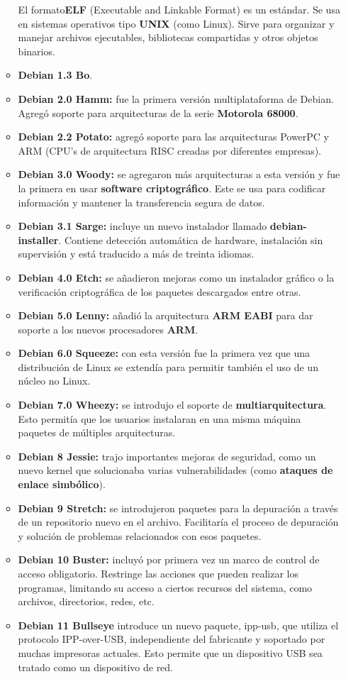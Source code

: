 \documentclass[a4paper, 12pt]{book}
\begin{document}
\begin{itemize}
\begin{itemize}
		El formato\textbf{ELF} (Executable and Linkable Format) es un estándar. Se usa en sistemas operativos tipo \textbf{UNIX} (como Linux). Sirve para organizar y manejar archivos ejecutables, bibliotecas compartidas y otros objetos binarios.
		\item \textbf {Debian 1.3 Bo}.
		\item \textbf {Debian 2.0 Hamm: }fue la primera versión multiplataforma de Debian. Agregó soporte para arquitecturas de la serie \textbf{Motorola 68000}.
		\item \textbf {Debian 2.2 Potato: }agregó soporte para las arquitecturas  PowerPC y ARM (CPU's de arquitectura RISC creadas por diferentes empresas).
		\item \textbf {Debian 3.0 Woody: }se agregaron más arquitecturas a esta versión y fue la primera en usar \textbf {software criptográfico}. Este se usa para codificar información y mantener la transferencia segura de datos.
		\item \textbf {Debian 3.1 Sarge: }incluye un nuevo instalador llamado \textbf {debian-installer}. Contiene detección automática de hardware, instalación sin supervisión y está traducido a más de treinta idiomas.
		\item \textbf {Debian 4.0 Etch: }se añadieron mejoras como un instalador gráfico o la verificación criptográfica de los paquetes descargados entre otras.
		\item \textbf {Debian 5.0 Lenny: }añadió la arquitectura \textbf {ARM EABI} para dar soporte a los nuevos procesadores \textbf {ARM}.
		\item \textbf {Debian 6.0 Squeeze: }con esta versión fue la primera vez que una distribución de Linux se extendía para permitir también el uso de un núcleo no Linux.
		\item \textbf {Debian 7.0 Wheezy: }se introdujo el soporte de \textbf {multiarquitectura}. Esto permitía que los usuarios instalaran en una misma máquina paquetes de múltiples arquitecturas.
		\item \textbf {Debian 8 Jessie: }trajo importantes mejoras de seguridad, como un nuevo kernel que solucionaba varias vulnerabilidades (como \textbf {ataques de enlace simbólico}).
		\item \textbf {Debian 9 Stretch: }se introdujeron paquetes para la depuración a través de un repositorio nuevo en el archivo. Facilitaría el proceso de depuración y solución de problemas relacionados con esos paquetes.
		\item \textbf {Debian 10 Buster: } incluyó por primera vez un marco de control de acceso obligatorio. Restringe las acciones que pueden realizar los programas, limitando su acceso a ciertos recursos del sistema, como archivos, directorios, redes, etc.
		\item \textbf {Debian 11 Bullseye} introduce un nuevo paquete, ipp-usb, que utiliza el protocolo IPP-over-USB, independiente del fabricante y soportado por muchas impresoras actuales. Esto permite que un dispositivo USB sea tratado como un dispositivo de red.
		
		
	\end{itemize}
	
\end{itemize}
\end{document}
